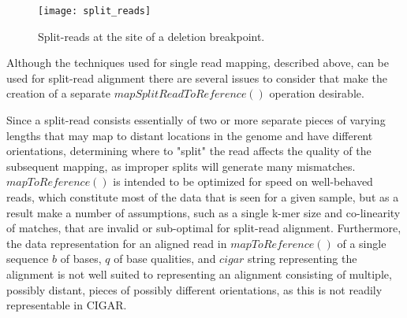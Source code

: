 \begin{figure}[H]
    \texttt{[image: split\_reads]}
    \centering
    \caption {Split-reads at the site of a deletion breakpoint.}
    \label{fig:split_reads}
\end{figure}

Although the techniques used for single read mapping, described above, can be used for split-read alignment there are several issues to consider that make the creation of a separate $mapSplitReadToReference()$ operation desirable. 

Since a split-read consists essentially of two or more separate pieces of varying lengths that may map to distant locations in the genome and have different orientations, determining where to "split" the read affects the quality of the subsequent mapping, as improper splits will generate many mismatches. $mapToReference()$ is intended to be optimized for speed on well-behaved reads, which constitute most of the data that is seen for a given sample, but as a result make a number of assumptions, such as a single k-mer size and co-linearity of matches, that are invalid or sub-optimal for split-read alignment. Furthermore, the data representation for an aligned read in $mapToReference()$ of a single sequence $b$ of bases, $q$ of base qualities, and $cigar$ string representing the alignment is not well suited to representing an alignment consisting of multiple, possibly distant, pieces of possibly different orientations, as this is not readily representable in CIGAR. 

